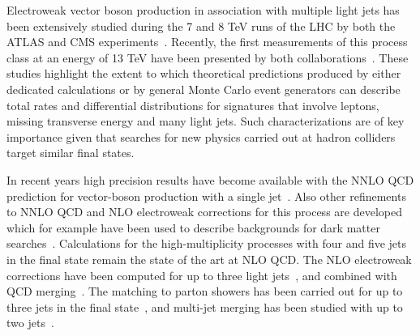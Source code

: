 Electroweak vector boson production in association
with multiple light jets has been extensively studied during the 7 and
8 TeV runs of the LHC by both the ATLAS and CMS
experiments~\cite{ATLAS:ratio2017,Aad:2014qxa,ATLASRatioWZ14,ATLAS7Zjets13,Aad:2012en,Aad:2011qv,Aad:2011xn,Aad:2010ab,Khachatryan:2015ira,Khachatryan:2016fue,CMS8Zjets16,CMS7Zjets15,Khachatryan:2014uva,Chatrchyan:2013tna,Chatrchyan:2011ig,Chatrchyan:2011ne}. Recently,
the first
measurements of this process class at an energy of 13 TeV have been
presented by both
collaborations~\cite{Aaboud:2017hbk,Sirunyan:2017wgx}. These studies highlight the extent to which theoretical
predictions produced by either dedicated
calculations or by general Monte Carlo event generators can describe total rates
and differential distributions for signatures that involve leptons, missing
transverse energy and many light jets. Such characterizations are of key importance given that searches for new physics carried out at hadron colliders
target similar final states.

In recent years high precision results have become available with the NNLO QCD prediction for vector-boson
production with a single
jet~\cite{Boughezal:2015dva,Boughezal:2015ded,Gehrmann-DeRidder:2016zml}. Also other
refinements to NNLO QCD and NLO electroweak corrections for this process are developed which for
example have been used to describe backgrounds for dark matter
searches~\cite{Lindert:2017olm}. Calculations
for the high-multiplicity processes with four and five
jets~\cite{BH:Z4j,BH:W5j} in the final state remain the state
of the art at NLO QCD. The NLO electroweak corrections have been computed for up to
three light jets~\cite{Denner:2014ina,Kallweit:2014xda}, and combined
with QCD merging~\cite{Kallweit:2015dum}. The matching to parton showers
has been carried out for up to three jets in the final
state~\cite{Hoeche:2012ft}, and multi-jet merging has been studied
with up to two
jets~\cite{Hoeche:2012yf,Lonnblad:2012ix,Frederix:2012ps}.


